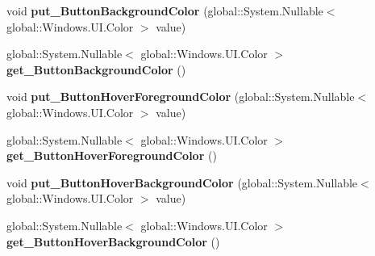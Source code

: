 \begin{DoxyCompactItemize}
\mbox{\label{class_windows_1_1_u_i_1_1_view_management_1_1_application_view_title_bar_a4bf81ad5fba26dac4114c2caf024a7a9}} 
void {\bfseries put\+\_\+\+Button\+Background\+Color} (global\+::\+System.\+Nullable$<$ global\+::\+Windows.\+U\+I.\+Color $>$ value)
\item 
\mbox{\label{class_windows_1_1_u_i_1_1_view_management_1_1_application_view_title_bar_a7e47596433a77023cf07c95e096f0a1c}} 
global\+::\+System.\+Nullable$<$ global\+::\+Windows.\+U\+I.\+Color $>$ {\bfseries get\+\_\+\+Button\+Background\+Color} ()
\item 
\mbox{\label{class_windows_1_1_u_i_1_1_view_management_1_1_application_view_title_bar_a81367f4399734083a0312e932602d91a}} 
void {\bfseries put\+\_\+\+Button\+Hover\+Foreground\+Color} (global\+::\+System.\+Nullable$<$ global\+::\+Windows.\+U\+I.\+Color $>$ value)
\item 
\mbox{\label{class_windows_1_1_u_i_1_1_view_management_1_1_application_view_title_bar_abb2bd226eff90e756e30fce411565e04}} 
global\+::\+System.\+Nullable$<$ global\+::\+Windows.\+U\+I.\+Color $>$ {\bfseries get\+\_\+\+Button\+Hover\+Foreground\+Color} ()
\item 
\mbox{\label{class_windows_1_1_u_i_1_1_view_management_1_1_application_view_title_bar_aab71134c8d012975419633c926f62d40}} 
void {\bfseries put\+\_\+\+Button\+Hover\+Background\+Color} (global\+::\+System.\+Nullable$<$ global\+::\+Windows.\+U\+I.\+Color $>$ value)
\item 
\mbox{\label{class_windows_1_1_u_i_1_1_view_management_1_1_application_view_title_bar_ad8730e54e00f186ed98dfd21d624e119}} 
global\+::\+System.\+Nullable$<$ global\+::\+Windows.\+U\+I.\+Color $>$ {\bfseries get\+\_\+\+Button\+Hover\+Background\+Color} ()
\item 
\mbox{\label{class_windows_1_1_u_i_1_1_view_management_1_1_application_view_title_bar_a435e7ae01a4b3ea59a80006b81279ccb}} 

\end{DoxyCompactItemize}
